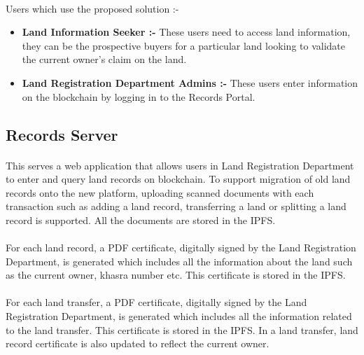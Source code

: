 \documentclass{article}
\begin{document}
    \paragraph{}
    Users which use the proposed solution :-
    \begin{itemize}
        \item \textbf{Land Information Seeker :-} These users need to access land information, they can be the prospective buyers for a particular land looking to validate the current owner's claim on the land.
        \item \textbf{Land Registration Department Admins :-} These users enter information on the blockchain by logging in to the Records Portal.
    \end{itemize}

    \subsection{Records Server}
        \paragraph{}
        This serves a web application that allows users in Land Registration Department to enter and query land records on blockchain. To support migration of old land records onto the new platform, uploading scanned documents with each transaction such as adding a land record, transferring a land or splitting a land record is supported. All the documents are stored in the IPFS.

        \paragraph{}
        For each land record, a PDF certificate, digitally signed by the Land Registration Department, is generated which includes all the information about the land such as the current owner, khasra number etc. This certificate is stored in the IPFS.
        
        \paragraph{}
        For each land transfer, a PDF certificate, digitally signed by the Land Registration Department, is generated which includes all the information related to the land transfer. This certificate is stored in the IPFS. In a land transfer, land record certificate is also updated to reflect the current owner.
\end{document}
